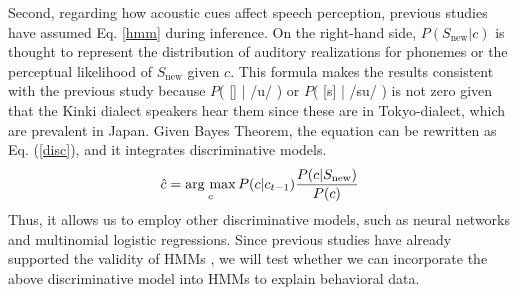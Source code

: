 \documentclass[a4paper,11pt,twocolumn]{article}
\newcommand{\argmax}{\mathop{\rm arg~max}\limits}
\begin{document}
Second, regarding how acoustic cues affect speech perception, previous studies \cite{wilson2013bayesian, kishiyama2021influence} have assumed Eq. \ref{hmm} during inference. On the right-hand side, $P(S_{\text{new}}|c)$ is thought to represent the distribution of auditory realizations for phonemes or the perceptual likelihood of $S_{\text{new}}$ given $c$. This formula makes the results consistent with the previous study because $P$( [\textsubring{\textturnm}] | /u/ ) or $P$( [s] | /su/ ) is not zero given that the Kinki dialect speakers hear them since these are in Tokyo-dialect, which are prevalent in Japan. Given Bayes Theorem, the equation can be rewritten as Eq. (\ref{disc}), and it integrates discriminative models.
%
\begin{equation} \label{disc}
    \hat{c} = \argmax_{c} P(c | c_{t-1}) \frac{P(c|S_{\text{new}})}{P(c)}
\end{equation}
%
Thus, it allows us to employ other discriminative models, such as neural networks and multinomial logistic regressions. Since previous studies have already supported the validity of HMMs \cite{kishiyama2021influence}, we will test whether we can incorporate the above discriminative model into HMMs to explain behavioral data.




\end{document}
